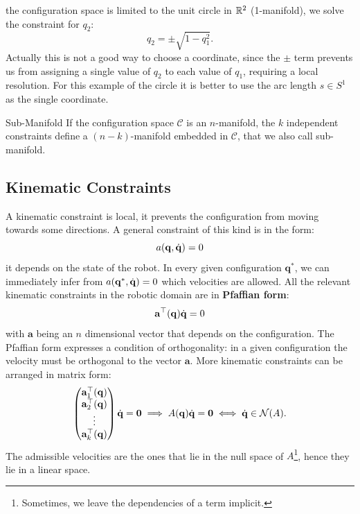 \documentclass[10pt, a4paper]{report}
\newcommand{\q}{{\mathbf q}}
\begin{document}
the configuration space is limited to the unit circle in ${\mathbb R}^2$ (1-manifold), we solve the constraint for $q_2$:\begin{equation}
    q_2=\pm\sqrt{1-q_1^2}.
\end{equation}
Actually this is not a good way to choose a coordinate, since the $\pm$ term prevents us from assigning a single value of $q_2$ to each value of $q_1$, requiring a local resolution. For this example of the circle it is better to use the arc length $s\in S^1$ as the single coordinate.
\begin{boxobservation}{Sub-Manifold}{}
    If the configuration space $\mathcal C$ is an $n$-manifold, the $k$ independent constraints define a $(n-k)$-manifold embedded in $\mathcal C$, that we also call sub-manifold.
\end{boxobservation}
\subsection{Kinematic Constraints}
A kinematic constraint is local, it prevents the configuration from moving towards some directions. A general constraint of this kind is in the form:\begin{equation}
    a(\q,\dq)=0
\end{equation}
it depends on the state of the robot. In every given configuration $\q^*$, we can immediately infer from $a(\q^*,\dq)=0$ which velocities are allowed. All the relevant kinematic constraints in the robotic domain are in \textbf{Pfaffian form}:\begin{equation}
   \mathbf a^\top(\q)\dq=0
\end{equation}
with $\mathbf a$ being an $n$ dimensional vector that depends on the configuration. The Pfaffian form expresses a condition of orthogonality: in a given configuration the velocity must be orthogonal to the vector $\mathbf a$. More kinematic constraints can be arranged in matrix form:\begin{equation}
    \begin{pmatrix}
        \mathbf a_1^\top(\q)\\
        \mathbf a_2^\top(\q)\\ \vdots\\ 
        \mathbf a_k^\top(\q)
    \end{pmatrix}\dq=\mathbf 0\implies A(\q)\dq=\mathbf 0\iff \dq\in\mathcal N(A).
\end{equation}
The admissible velocities are the ones that lie in the null space of $A$\footnote{
    Sometimes, we leave the dependencies of a term implicit.
}, hence they lie in a linear space. 
\end{document}
